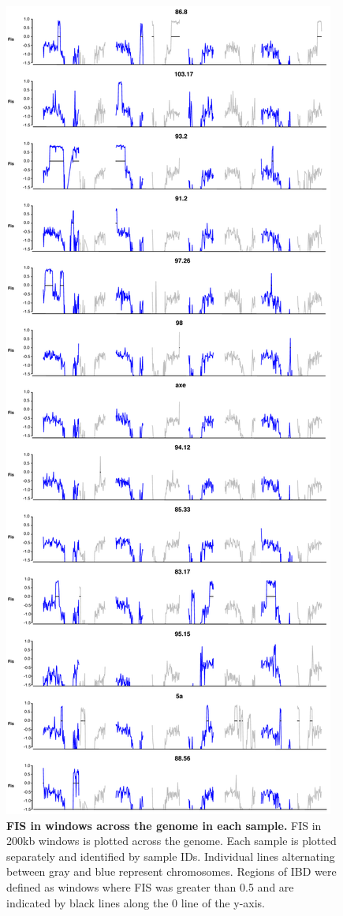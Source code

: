 \begin{figure}[ht!]
      \centering
       \includegraphics[scale=0.1]{Ch2FigS5}
    \caption{\textbf{FIS in windows across the genome in each sample.} FIS in 200kb windows is plotted across the genome. Each sample is plotted separately and identified by sample IDs. Individual lines alternating between gray and blue represent chromosomes. Regions of IBD were defined as windows where FIS was greater than 0.5 and are indicated by black lines along the 0 line of the y-axis.}
    \label{fig:figS5}
\end{figure}

